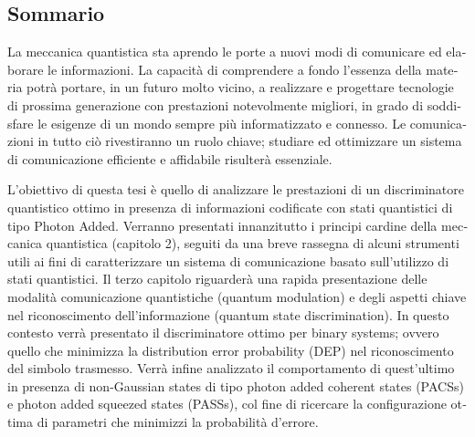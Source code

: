 
\begin{otherlanguage}{italian}
\chapter*{Sommario}
    La meccanica quantistica sta aprendo le porte a nuovi modi di comunicare ed elaborare le 
    informazioni. La capacità di comprendere a fondo l'essenza della materia potrà portare, 
    in un futuro molto vicino, a realizzare e progettare tecnologie di prossima generazione
    con prestazioni notevolmente migliori, in grado di soddisfare le esigenze di un mondo sempre
    più informatizzato e connesso.
    Le comunicazioni in tutto ciò rivestiranno un ruolo chiave; studiare ed ottimizzare un sistema
    di comunicazione efficiente e affidabile risulterà essenziale.

    L'obiettivo di questa tesi è quello di analizzare le prestazioni di un discriminatore quantistico ottimo 
    in presenza di informazioni codificate con stati quantistici di tipo \foreignlanguage{english}{Photon Added}. 
    Verranno presentati innanzitutto i principi cardine della meccanica quantistica (capitolo 2), 
    seguiti da una breve rassegna di alcuni strumenti utili ai fini di 
    caratterizzare un sistema di comunicazione basato sull'utilizzo di stati quantistici.
    Il terzo capitolo riguarderà una rapida presentazione delle modalità comunicazione quantistiche (\foreignlanguage{english}{quantum modulation})
    e degli aspetti chiave nel riconoscimento dell'informazione (\foreignlanguage{english}{quantum state discrimination}). In questo contesto 
    verrà presentato il discriminatore ottimo per \foreignlanguage{english}{binary systems}; ovvero quello che minimizza la \foreignlanguage{english}{distribution error
    probability} (DEP) nel riconoscimento del simbolo trasmesso. 
    Verrà infine analizzato il comportamento di quest'ultimo in presenza di \foreignlanguage{english}{non-Gaussian states} di tipo \foreignlanguage{english}{photon
    added coherent states} (PACSs) e \foreignlanguage{english}{photon added squeezed states} (PASSs), col fine di ricercare la configurazione
    ottima di parametri che minimizzi la probabilità d'errore.
\end{otherlanguage}